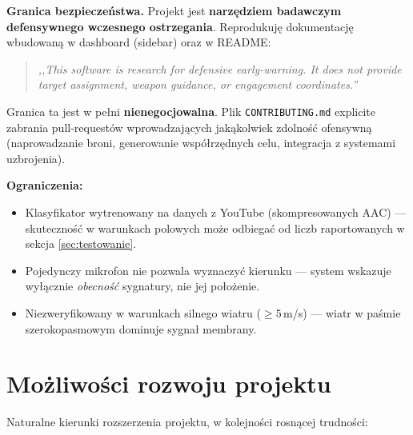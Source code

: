\documentclass[11pt,a4paper]{article}
\newcommand{\sectionref}[1]{sekcja \ref{#1}}
\begin{document}
\textbf{Granica bezpieczeństwa.} Projekt jest \textbf{narzędziem badawczym
defensywnego wczesnego ostrzegania}. Reprodukuję dokumentację wbudowaną w
dashboard (sidebar) oraz w README:

\begin{quote}
\itshape ,,This software is research for defensive early-warning. It does not
provide target assignment, weapon guidance, or engagement coordinates.''
\end{quote}

Granica ta jest w pełni \textbf{nienegocjowalna}. Plik \texttt{CONTRIBUTING.md}
explicite zabrania pull-requestów wprowadzających jakąkolwiek zdolność
ofensywną (naprowadzanie broni, generowanie współrzędnych celu, integracja
z systemami uzbrojenia).

\textbf{Ograniczenia:}
\begin{itemize}[noitemsep]
  \item Klasyfikator wytre\-no\-wany na danych z YouTube (skompresowanych AAC)
        --- skuteczność w warunkach polowych może odbiegać od liczb
        raportowanych w \sectionref{sec:testowanie}.
  \item Pojedynczy mikrofon nie pozwala wyznaczyć kierunku --- system
        wskazuje wyłącznie \emph{obecność} sygnatury, nie jej położenie.
  \item Niezweryfikowany w warunkach silnego wiatru ($\geq 5$\,m/s) ---
        wiatr w paśmie szerokopasmowym dominuje sygnał membrany.
\end{itemize}

\section{Możliwości rozwoju projektu}
\label{sec:rozwoj}

Naturalne kierunki rozszerzenia projektu, w kolejności rosnącej trudności:
\end{document}

